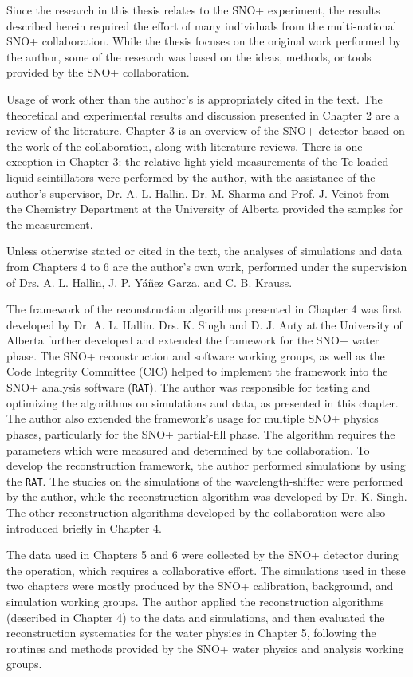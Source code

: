 Since the research in this thesis relates to the SNO+ experiment, the results described herein required the effort of many individuals from the multi-national SNO+ collaboration. While the thesis focuses on the original work performed by the author, some of the research was based on the ideas, methods, or tools provided by the SNO+ collaboration.

Usage of work other than the author's is appropriately cited in the text. The theoretical and experimental results and discussion presented in Chapter 2 are a review of the literature. Chapter 3 is an overview of the SNO+ detector based on the work of the collaboration, along with literature reviews. There is one exception in Chapter 3: the relative light yield measurements of the Te-loaded liquid scintillators were performed by the author, with the assistance of the author's supervisor, Dr. A. L. Hallin. Dr. M. Sharma and Prof. J. Veinot from the Chemistry Department at the University of Alberta provided the samples for the measurement.

Unless otherwise stated or cited in the text, the analyses of simulations and data from Chapters 4 to 6 are the author's own work, performed under the supervision of Drs. A. L. Hallin, J. P. Y\'{a}\~{n}ez Garza, and C. B. Krauss.

The framework of the reconstruction algorithms presented in Chapter 4 was first developed by Dr. A. L. Hallin. Drs. K. Singh and D. J. Auty at the University of Alberta further developed and extended the framework for the SNO+ water phase. The SNO+ reconstruction and software working groups, as well as the Code Integrity Committee (CIC) helped to implement the framework into the SNO+ analysis software (\texttt{RAT}). The author was responsible for testing and optimizing the algorithms on simulations and data, as presented in this chapter. The author also extended the framework's usage for multiple SNO+ physics phases, particularly for the SNO+ partial-fill phase. The algorithm requires the parameters which were measured and determined by the collaboration. To develop the reconstruction framework, the author performed simulations by using the \texttt{RAT}. The studies on the simulations of the wavelength-shifter were performed by the author, while the reconstruction algorithm was developed by Dr. K. Singh. The other reconstruction algorithms developed by the collaboration were also introduced briefly in Chapter 4.

The data used in Chapters 5 and 6 were collected by the SNO+ detector during the operation, which requires a collaborative effort. The simulations used in these two chapters were mostly produced by the SNO+ calibration, background, and simulation working groups. The author applied the reconstruction algorithms (described in Chapter 4) to the data and simulations, and then evaluated the reconstruction systematics for the water physics in Chapter 5, following the routines and methods provided by the SNO+ water physics and analysis working groups.

